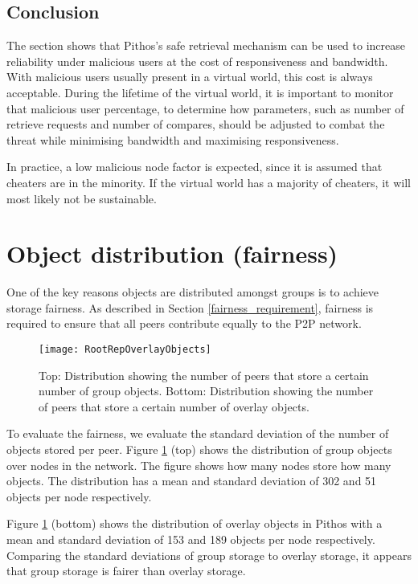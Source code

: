 \subsection{Conclusion}

The section shows that Pithos's safe retrieval mechanism can be used to increase reliability under malicious users at the cost of responsiveness and bandwidth. With malicious users usually present in a virtual world, this cost is always acceptable. During the lifetime of the virtual world, it is important to monitor that malicious user percentage, to determine how parameters, such as number of retrieve requests and number of compares, should be adjusted to combat the threat while minimising bandwidth and maximising responsiveness.

In practice, a low malicious node factor is expected, since it is assumed that cheaters are in the minority. If the virtual world has a majority of cheaters, it will most likely not be sustainable.

\section{Object distribution (fairness)}

One of the key reasons objects are distributed amongst groups is to achieve storage fairness. As described in Section \ref{fairness_requirement}, fairness is required to ensure that all peers contribute equally to the P2P network.

\begin{figure}[htbp]
 \centering
 \texttt{[image: RootRepOverlayObjects]}
 \caption{Top: Distribution showing the number of peers that store a certain number of group objects. Bottom: Distribution showing the number of peers that store a certain number of overlay objects.}
 \label{fig_group_overlay_objects}
\end{figure}
%
To evaluate the fairness, we evaluate the standard deviation of the number of objects stored per peer. Figure \ref{fig_group_overlay_objects} (top) shows the distribution of group objects over nodes in the network. The figure shows how many nodes store how many objects. The distribution has a mean and standard deviation of 302 and 51 objects per node respectively.

Figure \ref{fig_group_overlay_objects} (bottom) shows the distribution of overlay objects in Pithos with a mean and standard deviation of 153 and 189 objects per node respectively. Comparing the standard deviations of group storage to overlay storage, it appears that group storage is fairer than overlay storage.

